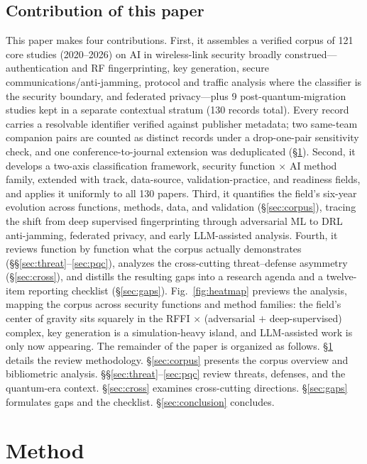 \subsection{Contribution of this paper}
This paper makes four contributions. First, it assembles a verified corpus of 121 core studies (2020--2026) on AI in wireless-link security broadly construed---authentication and RF fingerprinting, key generation, secure communications/anti-jamming, protocol and traffic analysis where the classifier is the security boundary, and federated privacy---plus 9 post-quantum-migration studies kept in a separate contextual stratum (130 records total). Every record carries a resolvable identifier verified against publisher metadata; two same-team companion pairs are counted as distinct records under a drop-one-pair sensitivity check, and one conference-to-journal extension was deduplicated (\S\ref{sec:methods}). Second, it develops a two-axis classification framework, security function $\times$ AI method family, extended with track, data-source, validation-practice, and readiness fields, and applies it uniformly to all 130 papers. Third, it quantifies the field's six-year evolution across functions, methods, data, and validation (\S\ref{sec:corpus}), tracing the shift from deep supervised fingerprinting through adversarial ML to DRL anti-jamming, federated privacy, and early LLM-assisted analysis. Fourth, it reviews function by function what the corpus actually demonstrates (\S\S\ref{sec:threat}--\ref{sec:pqc}), analyzes the cross-cutting threat--defense asymmetry (\S\ref{sec:cross}), and distills the resulting gaps into a research agenda and a twelve-item reporting checklist (\S\ref{sec:gaps}).
Fig.~\ref{fig:heatmap} previews the analysis, mapping the corpus across security functions and method families: the field's center of gravity sits squarely in the RFFI $\times$ (adversarial $+$ deep-supervised) complex, key generation is a simulation-heavy island, and LLM-assisted work is only now appearing. The remainder of the paper is organized as follows. \S\ref{sec:methods} details the review methodology. \S\ref{sec:corpus} presents the corpus overview and bibliometric analysis. \S\S\ref{sec:threat}--\ref{sec:pqc} review threats, defenses, and the quantum-era context. \S\ref{sec:cross} examines cross-cutting directions. \S\ref{sec:gaps} formulates gaps and the checklist. \S\ref{sec:conclusion} concludes.

\section{Method}
\label{sec:methods}
